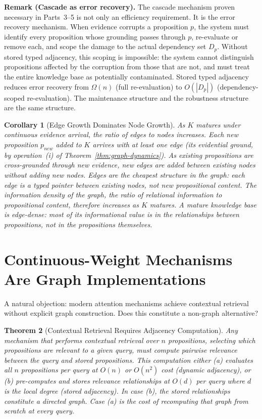 \documentclass[11pt]{article}
\newtheorem{theorem}{Theorem}
\newtheorem{corollary}[theorem]{Corollary}
\theoremstyle{definition}
\begin{document}
\textbf{Remark (Cascade as error recovery).}
The cascade mechanism proven necessary in Parts~3--5 is not only an
efficiency requirement. It is the error recovery mechanism. When
evidence corrupts a proposition $p$, the system must identify every
proposition whose grounding passes through $p$, re-evaluate or remove
each, and scope the damage to the actual dependency set $D_p$. Without
stored typed adjacency, this scoping is impossible: the system cannot
distinguish propositions affected by the corruption from those that are
not, and must treat the entire knowledge base as potentially
contaminated. Stored typed adjacency reduces error recovery from
$\Omega(n)$ (full re-evaluation) to $O(|D_p|)$ (dependency-scoped
re-evaluation). The maintenance structure and the robustness structure
are the same structure.

\begin{corollary}[Edge Growth Dominates Node Growth]
\label{cor:edge-growth}
As $K$ matures under continuous evidence arrival, the ratio of edges to
nodes increases. Each new proposition $p_{new}$ added to $K$ arrives with
at least one edge (its evidential ground, by operation~(i) of
Theorem~\ref{thm:graph-dynamics}). As existing propositions are
cross-grounded through new evidence, new edges are added between
existing nodes without adding new nodes. Edges are the cheapest
structure in the graph: each edge is a typed pointer between existing
nodes, not new propositional content. The information density of the
graph, the ratio of relational information to propositional content,
therefore increases as $K$ matures. A mature knowledge base is
edge-dense: most of its informational value is in the relationships
between propositions, not in the propositions themselves.
\end{corollary}

\section{Continuous-Weight Mechanisms Are Graph Implementations}
\label{sec:attention}

A natural objection: modern attention mechanisms achieve contextual
retrieval without explicit graph construction. Does this constitute a
non-graph alternative?

\begin{theorem}[Contextual Retrieval Requires Adjacency Computation]
\label{thm:attention}
Any mechanism that performs contextual retrieval over $n$ propositions,
selecting which propositions are relevant to a given query, must
compute pairwise relevance between the query and stored propositions.
This computation either (a) evaluates all $n$ propositions per query at
$O(n)$ or $O(n^2)$ cost (dynamic adjacency), or (b) pre-computes and
stores relevance relationships at $O(d)$ per query where $d$ is the
local degree (stored adjacency). In case (b), the stored relationships
constitute a directed graph. Case (a) is the cost of recomputing that
graph from scratch at every query.
\end{theorem}
\end{document}
